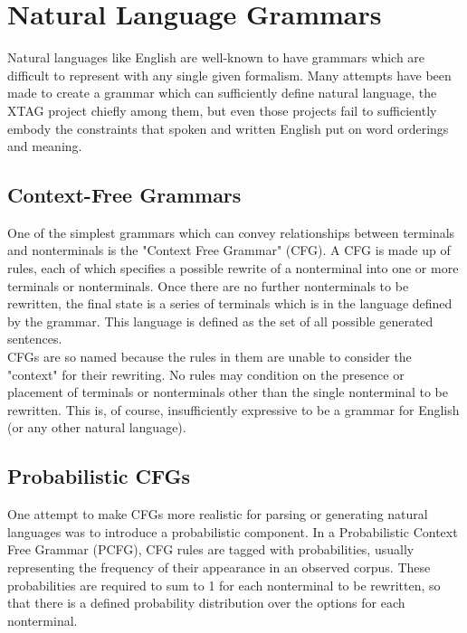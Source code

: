 \section{Natural Language Grammars}

Natural languages like English are well-known to have grammars which are difficult
to represent with any single given formalism.  Many attempts have been made to
create a grammar which can sufficiently define natural language, the XTAG project
chiefly among them, but even those projects fail to sufficiently embody the
constraints that spoken and written English put on word orderings and meaning.

\subsection{Context-Free Grammars}

One of the simplest grammars which can convey relationships between terminals
and nonterminals is the "Context Free Grammar" (CFG).  A CFG is made up of rules,
each of which specifies a possible rewrite of a nonterminal into one or more
terminals or nonterminals.  Once there are no further nonterminals to be rewritten,
the final state is a series of terminals which is in the language defined by the grammar.
This language is defined as the set of all possible generated sentences.\\

CFGs are so named because the rules in them are unable to consider the "context" for
their rewriting.  No rules may condition on the presence or placement of terminals
or nonterminals other than the single nonterminal to be rewritten.  This is, of course,
insufficiently expressive to be a grammar for English (or any other natural language).\\

\subsection{Probabilistic CFGs}

One attempt to make CFGs more realistic for parsing or generating natural languages was to
introduce a probabilistic component.  In a Probabilistic Context Free Grammar (PCFG), CFG
rules are tagged with probabilities, usually representing the frequency of their appearance in
an observed corpus.  These probabilities are required to sum to 1 for each nonterminal to
be rewritten, so that there is a defined probability distribution over the options for each nonterminal.\\

